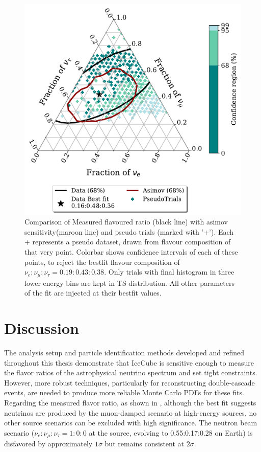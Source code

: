\begin{figure}[h]
    
    \includegraphics{./figures/results/PE_data_asimov_68_BkgOnly.pdf}


    \caption{Comparison of Measured flavoured ratio (black line) with asimov sensitivity(maroon line) and pseudo trials (marked with '+'). Each + represents a pseudo dataset, drawn from flavour composition of that very point. Colorbar shows confidence intervals of each of these points, to reject the bestfit flavour composition of $\nu_e:\nu_{\mu}:\nu_{\tau} = 0.19:0.43:0.38$. Only trials with final histogram in three lower energy bins are kept in TS distribution. All other parameters of the fit are injected at their bestfit values.}
\end{figure}

\section{Discussion}
\label{sec:results_discussion}

The analysis setup and particle identification methods developed and refined throughout this thesis demonstrate that IceCube is sensitive enough to measure the flavor ratios of the astrophysical neutrino spectrum and set tight constraints. However, more robust techniques, particularly for reconstructing double-cascade events, are needed to produce more reliable Monte Carlo PDFs for these fits. Regarding the measured flavor ratio, as shown in , although the best fit suggests neutrinos are produced by the muon-damped scenario at high-energy sources, no other source scenarios can be excluded with high significance. The neutron beam scenario ($\nu_e:\nu_{\mu}:\nu_{\tau} = 1:0:0$ at the source, evolving to 0.55:0.17:0.28 on Earth) is disfavored by approximately $1\sigma$ but remains consistent at $2\sigma$.

